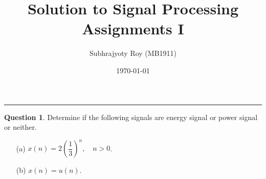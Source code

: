 \documentclass[12pt]{article}
\title{Solution to Signal Processing Assignments I}
\author{Subhrajyoty Roy (MB1911)}
\date{\today}
\theoremstyle{definition}
\newtheorem{question}{Question}
\begin{document}
\maketitle

\begin{center}
    \rule{0.8\textwidth}{1px} 
\end{center}
\vspace*{2em}

\begin{question}
    Determine if the following signals are energy signal or power signal or neither.
    \begin{enumerate}
        \item[(a)] $x(n) = 2\left(\dfrac{1}{3}\right)^n, \quad n > 0$.
        \item[(b)] $x(n) = u(n)$. 
    \end{enumerate}
\end{question}
\end{document}

